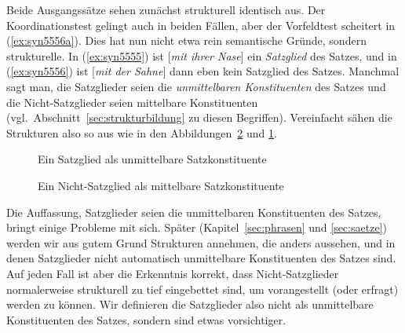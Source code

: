 Beide Ausgangssätze sehen zunächst strukturell identisch aus.
Der Koordinationstest gelingt auch in beiden Fällen, aber der Vorfeldtest scheitert in (\ref{ex:syn5556a}).
Dies hat nun nicht etwa rein semantische Gründe, sondern strukturelle.
In (\ref{ex:syn5555}) ist [\textit{mit ihrer Nase}] ein \textit{Satzglied} des Satzes, und in (\ref{ex:syn5556}) ist [\textit{mit der Sahne}] dann eben kein Satzglied des Satzes.
Manchmal sagt man, die Satzglieder seien die \textit{unmittelbaren Konstituenten} des Satzes und die Nicht-Satzglieder seien mittelbare Konstituenten (vgl.\ Abschnitt~\ref{sec:strukturbildung} zu diesen Begriffen).
Vereinfacht sähen die Strukturen also so aus wie in den Abbildungen~\ref{fig:mittelbarekonstituente} und \ref{fig:unmittelbarekonstituente}.

\begin{figure}
  \centering
  \caption{Ein Satzglied als unmittelbare Satzkonstituente}
  \label{fig:unmittelbarekonstituente}
\end{figure}

\begin{figure}
  \centering
  \caption{Ein Nicht-Satzglied als mittelbare Satzkonstituente}
  \label{fig:mittelbarekonstituente}
\end{figure}

Die Auffassung, Satzglieder seien die unmittelbaren Konstituenten des Satzes, bringt einige Probleme mit sich.
Später (Kapitel~\ref{sec:phrasen} und \ref{sec:saetze}) werden wir aus gutem Grund Strukturen annehmen, die anders aussehen, und in denen Satzglieder nicht automatisch unmittelbare Konstituenten des Satzes sind.
Auf jeden Fall ist aber die Erkenntnis korrekt, dass Nicht-Satzglieder normalerweise strukturell zu tief eingebettet sind, um \zB vorangestellt (oder erfragt) werden zu können.
Wir definieren die Satzglieder also nicht als unmittelbare Konstituenten des Satzes, sondern sind etwas vorsichtiger.


